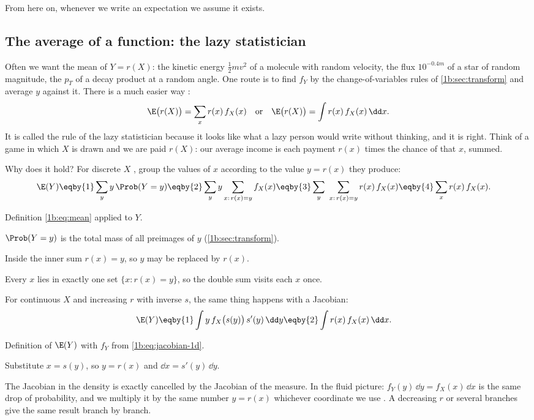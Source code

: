 From here on, whenever we write an expectation we assume it exists.

\subsection{The average of a function: the lazy statistician}

Often we want the mean of $Y=r(X)$: the kinetic energy $\tfrac12mv^2$ of a
molecule with random velocity, the flux $10^{-0.4m}$ of a star of random
magnitude, the $p_T$ of a decay product at a random angle. One route is to
find $f_Y$ by the change-of-variables rules of \cref{1b:sec:transform} and
average $y$ against it. There is a much easier way
:
\begin{equation}
  \E\bigl(r(X)\bigr)=\sum_xr(x)\,f_X(x)
  \quad\text{or}\quad
  \E\bigl(r(X)\bigr)=\int r(x)\,f_X(x)\,\dd x .
  \label{1b:eq:lotus}
\end{equation}
It is called the rule of the lazy statistician because it looks like what a
lazy person would write without thinking, and it is right. Think of a game
in which $X$ is drawn and we are paid $r(X)$: our average income is each
payment $r(x)$ times the chance of that $x$, summed.

Why does it hold? For discrete $X$ , group the
values of $x$ according to the value $y=r(x)$ they produce:
\begin{align*}
  \E(Y)
  &\eqby{1} \sum_y y\,\Prob(Y=y)
   \eqby{2} \sum_y y\sum_{x:\,r(x)=y}f_X(x)
   \eqby{3} \sum_y\ \sum_{x:\,r(x)=y}r(x)\,f_X(x)
   \eqby{4} \sum_x r(x)\,f_X(x) .
\end{align*}
\begin{explain}
  \item Definition \eqref{1b:eq:mean} applied to $Y$.
  \item $\Prob(Y=y)$ is the total mass of all preimages of $y$
        (\cref{1b:sec:transform}).
  \item Inside the inner sum $r(x)=y$, so $y$ may be replaced by $r(x)$.
  \item Every $x$ lies in exactly one set $\{x:r(x)=y\}$, so the double sum
        visits each $x$ once.
\end{explain}
For continuous $X$ and increasing $r$ with inverse $s$, the same thing
happens with a Jacobian:
\begin{align*}
  \E(Y)
  &\eqby{1} \int y\,f_X\bigl(s(y)\bigr)\,s'(y)\,\dd y
   \eqby{2} \int r(x)\,f_X(x)\,\dd x .
\end{align*}
\begin{explain}
  \item Definition of $\E(Y)$ with $f_Y$ from \eqref{1b:eq:jacobian-1d}.
  \item Substitute $x=s(y)$, so $y=r(x)$ and $\dd x=s'(y)\,\dd y$.
\end{explain}
The Jacobian in the density is exactly cancelled by the Jacobian of the
measure. In the fluid picture: $f_Y(y)\,\dd y=f_X(x)\,\dd x$ is the same
drop of probability, and we multiply it by the same number $y=r(x)$
whichever coordinate we use . A decreasing $r$ or
several branches give the same result branch by branch.

